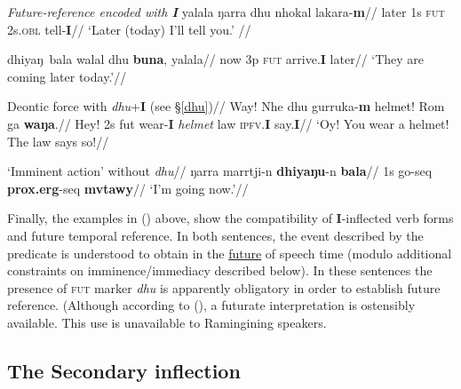 \pex {} \textit{Future-reference encoded with \textbf{I}}
\a{}\begingl\gla yalala ŋarra dhu nhokal lakara-\textbf{m}//
\glb later 1s \textsc{fut} 2s\textsc{.obl} tell-\textbf{I}//
\glft `Later (today) I'll tell you.' //\endgl

\a{}\begingl \gla dhiyaŋ~bala walal dhu \textbf{buna}, yalala//
\glb now 3p \textsc{fut} arrive.\textbf{I} later//
\glft`They are coming later today.'//\endgl


\a\begingl\glpreamble Deontic force with \textit{dhu}+\textbf{I} (see §\ref{dhu})//
\gla Way! Nhe dhu gurruka-\textbf{m} helmet! Rom ga \textbf{waŋa}.//
\glb Hey! 2s \gls{fut} wear-\textbf{I} \textit{helmet} law \textsc{ipfv.\textbf{I}}  say.\textbf{I}//
\glft`Oy! You wear a helmet! The law says so!\trailingcitation{[AW~20170730]}//\endgl

\a{}\begingl\glpreamble `Imminent action' without \textit{dhu}//
\gla \ljudge{$ ^{\%*} $}ŋarra marrtji-n \textbf{dhiyaŋu}-n \textbf{bala}//
\glb 1s go-\gls{seq} \textbf{\gls{prox}.\gls{erg}}-\gls{seq} \textbf{\gls{mvtawy}}//
\glft`I'm going now.'//\endgl

\xe


Finally, the examples in () above, show the compatibility of \textbf{I}-inflected verb forms and future temporal reference. In both sentences, the event described by the predicate is understood to obtain in the \underline{future} of speech time (modulo additional constraints on imminence/immediacy described below).  In these sentences the presence of \textsc{fut} marker \textit{dhu} is apparently obligatory in order to establish future reference. (Although according to \citet[256]{Wilkinson1991} (), a futurate interpretation is ostensibly available. This use is unavailable to Ramingining speakers.

\subsection{The Secondary inflection}

